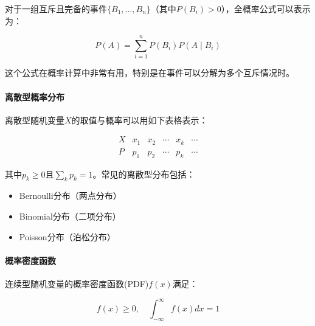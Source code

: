 \begin{flushleft}
	对于一组互斥且完备的事件$\{B_1,\dots,B_n\}$（其中$P(B_i) > 0$），全概率公式可以表示为：
\end{flushleft}


\begin{equation}
P(A) = \sum_{i=1}^n P(B_i) P(A \mid B_i)
\end{equation}

\begin{flushleft}
	这个公式在概率计算中非常有用，特别是在事件可以分解为多个互斥情况时。
\end{flushleft}


\paragraph*{离散型概率分布}

\begin{flushleft}
	离散型随机变量$X$的取值与概率可以用如下表格表示：
\end{flushleft}

\begin{equation*}
\begin{array}{llllll}
	X & x_1 & x_2 & \cdots & x_k & \cdots \\
	\hline
	P & p_1 & p_2 & \cdots & p_k & \cdots 
\end{array}
\end{equation*}

\begin{flushleft}
	其中$p_k \geqslant 0$且$\sum_k p_k = 1$。常见的离散型分布包括：
\end{flushleft}

\begin{itemize}
	\item Bernoulli分布（两点分布）
	\item Binomial分布（二项分布）
	\item Poisson分布（泊松分布）
\end{itemize}

\paragraph*{概率密度函数}

\begin{flushleft}
	连续型随机变量的概率密度函数(PDF)$f(x)$满足：
\end{flushleft}

\begin{equation}
f(x) \geqslant 0, \quad \int_{-\infty}^{\infty} f(x) dx = 1
\end{equation}

